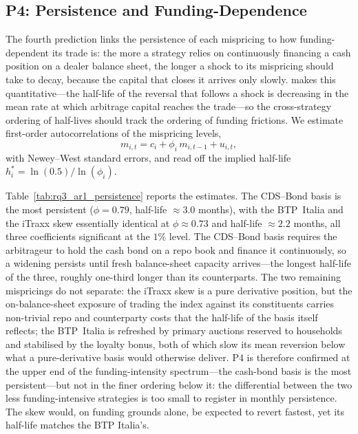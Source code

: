 
\subsection{P4: Persistence and Funding-Dependence}
\label{sec:rq3_p4}

The fourth prediction links the persistence of each mispricing to how
funding-dependent its trade is: the more a strategy relies on
continuously financing a cash position on a dealer balance sheet, the
longer a shock to its mispricing should take to decay, because the
capital that closes it arrives only slowly. \citet{duffie2010presidential}
makes this quantitative---the half-life of the reversal that follows a
shock is decreasing in the mean rate at which arbitrage capital reaches
the trade---so the cross-strategy ordering of half-lives should track
the ordering of funding frictions. We estimate first-order
autocorrelations of the mispricing levels,
\begin{equation}\label{eq:ar1}
  m_{i,t} = c_i + \phi_i\,m_{i,t-1} + u_{i,t},
\end{equation}
with Newey--West standard errors, and read off the
implied half-life $h_i^{*} = \ln(0.5)/\ln(\phi_i)$.

Table~\ref{tab:rq3_ar1_persistence} reports the estimates. The
CDS--Bond basis is the most persistent ($\phi = 0.79$, half-life
$\approx 3.0$ months), with the BTP~Italia and the iTraxx skew
essentially identical at $\phi \approx 0.73$ and half-life
$\approx 2.2$ months, all three coefficients significant at the
$1\%$ level. The CDS--Bond basis requires the arbitrageur to hold
the cash bond on a repo book and finance it continuously, so a
widening persists until fresh balance-sheet capacity arrives---the
longest half-life of the three, roughly one-third longer than its
counterparts.
The two remaining mispricings do not separate: the iTraxx skew is a
pure derivative position, but the on-balance-sheet exposure of
trading the index against its constituents carries non-trivial repo
and counterparty costs that the half-life of the basis itself
reflects; the BTP~Italia is refreshed by primary auctions reserved
to households and stabilised by the loyalty bonus, both of which
slow its mean reversion below what a pure-derivative basis would
otherwise deliver. P4 is therefore confirmed at the upper end of the funding-intensity spectrum---the cash-bond basis
is the most persistent---but not in the finer ordering below it: the differential between the two
less funding-intensive strategies is too small to register in monthly persistence. The skew would, 
on funding grounds alone, be expected to revert fastest, yet its half-life matches the BTP Italia's.

